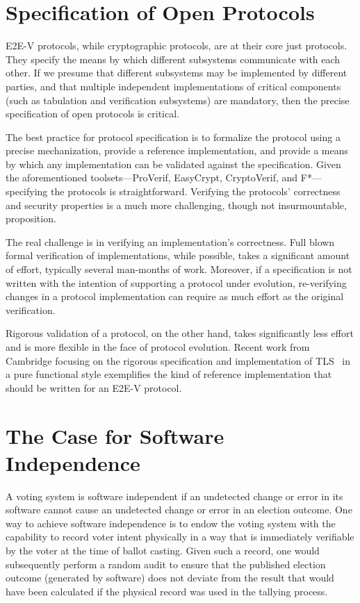 \section{Specification of Open Protocols} 

E2E-V protocols, while cryptographic protocols, are at their core just
protocols. They specify the means by which different subsystems
communicate with each other. If we presume that different subsystems
may be implemented by different parties, and that multiple independent
implementations of critical components (such as tabulation and
verification subsystems) are mandatory, then the precise specification
of open protocols is critical.

The best practice for protocol specification is to formalize the
protocol using a precise mechanization, provide a reference
implementation, and provide a means by which any implementation can be
validated against the specification. Given the aforementioned
toolsets---ProVerif, EasyCrypt, CryptoVerif, and F*---specifying the
protocols is straightforward. Verifying the protocols' correctness and
security properties is a much more challenging, though not
insurmountable, proposition.

The real challenge is in verifying an implementation's correctness.
Full blown formal verification of implementations, while possible,
takes a significant amount of effort, typically several man-months of
work. Moreover, if a specification is not written with the intention
of supporting a protocol under evolution, re-verifying changes in a
protocol implementation can require as much effort as the original
verification.

Rigorous validation of a protocol, on the other hand, takes
significantly less effort and is more flexible in the face of protocol
evolution. Recent work from Cambridge focusing on the rigorous
specification and implementation of TLS~\cite{nqsb-TLS} in a pure
functional style exemplifies the kind of reference implementation that
should be written for an E2E-V protocol.

\section{The Case for Software Independence}

A voting system is software independent if an undetected change or
error in its software cannot cause an undetected change or error in an
election outcome. One way to achieve software independence is to endow
the voting system with the capability to record voter intent
physically in a way that is immediately verifiable by the voter at the
time of ballot casting. Given such a record, one would subsequently
perform a random audit to ensure that the published election outcome
(generated by software) does not deviate from the result that would
have been calculated if the physical record was used in the tallying
process.

